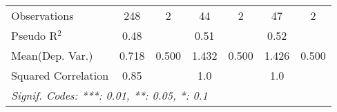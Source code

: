 \begin{tabular}{lcccccc}
   Observations                                               & 248           & 2    & 44           & 2    & 47      & 2\\  
   Pseudo R$^2$                                               & 0.48          &      & 0.51         &      & 0.52    & \\  
Mean(Dep. Var.) & 0.718 & 0.500 & 1.432 & 0.500 & 1.426 & 0.500 \\
   Squared Correlation                                        & 0.85          &      & 1.0          &      & 1.0     & \\  
   \midrule \midrule
   \multicolumn{7}{l}{\emph{Signif. Codes: ***: 0.01, **: 0.05, *: 0.1}}\\
\end{tabular}
\par\endgroup
